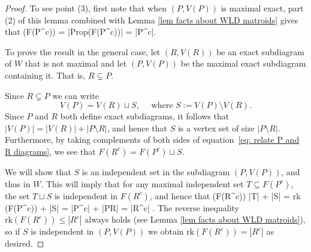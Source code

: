 \documentclass[11pt]{article}
\newcommand{\rk}{\textrm{rk} }
\def\ba #1\ea{\begin{align} #1 \end{align}}
\def\bas #1\eas{\begin{align*} #1 \end{align*}}
\newcommand{\cP}{\mathcal{P}}
\newcommand{\Prop}{\textrm{Prop}}
\theoremstyle{remark}
\theoremstyle{definition}
\begin{document}
\begin{proof}

To see point (3), first note that when $(P,V(P))$ is maximal exact, part (2) of this lemma combined with Lemma \ref{lem facts about WLD matroids} gives that
\bas\rk(F(P^c)) = |\Prop(F(P^c))| = |P^c|.\eas

To prove the result in the general case, let $(R,V(R))$ be an exact subdiagram of $W$ that is not maximal and let $(P, V(P))$ be the maximal exact subdiagram containing it. That is, $R \subsetneq P$.

Since $R \subsetneq P$ we can write 
\begin{equation}\label{eq: relate P and R diagrams}V(P) = V(R) \sqcup S, \quad \text{ where } S := V(P) \setminus V(R).\end{equation}
Since $P$ and $R$ both define exact subdiagrams, it follows that $|V(P)| = |V(R)| + |P \setminus R|$, and hence that $S$ is a vertex set of size $|P \setminus R|$. Furthermore, by taking complements of both sides of equation~\eqref{eq: relate P and R diagrams}, we see that $F(R^c) = F(P^c) \sqcup S$. 

We will show that $S$ is an independent set in the subdiagram $(P, V(P))$, and thus in $W$. This will imply that for any maximal independent set $T \subseteq F(P^c)$, the set $T \sqcup S$ is independent in $F(R^c)$, and hence that 
\bas \rk (F(R^c)) \geq |T| + |S| = \rk (F(P^c)) + |S| = |P^c| + |P\setminus R| = |R^c|  \;.\eas 
The reverse inequality $\rk (F(R^c)) \leq |R^c|$ always holds (see Lemma \ref{lem facts about WLD matroids}), so if $S$ is independent in $(P,V(P))$ we obtain $\rk (F(R^c)) = |R^c|$ as desired.


\end{proof}
\end{document}
